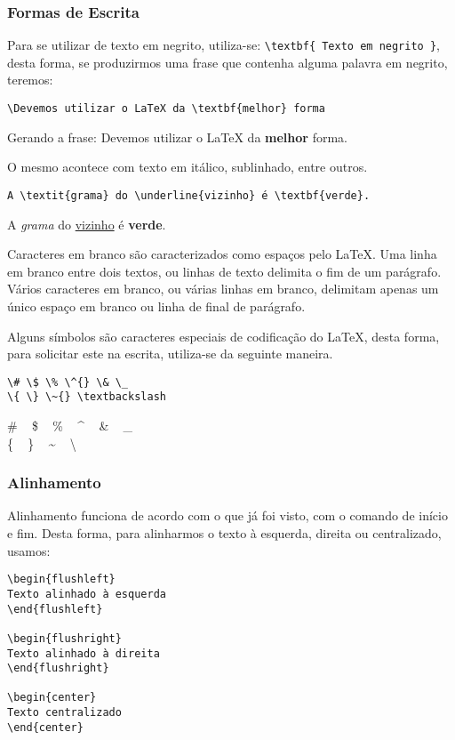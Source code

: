 \subsubsection{Formas de Escrita}
\label{formasdeescrita}
Para se utilizar de texto em negrito, utiliza-se:
\verb|\textbf{ Texto em negrito }|, desta forma, se produzirmos uma frase que contenha alguma palavra em negrito, teremos:

\begin{verbatim}
\Devemos utilizar o LaTeX da \textbf{melhor} forma
\end{verbatim}

Gerando a frase:
Devemos utilizar o LaTeX da \textbf{melhor} forma.

O mesmo acontece com texto em itálico, sublinhado, entre outros.

\begin{verbatim}
A \textit{grama} do \underline{vizinho} é \textbf{verde}.
\end{verbatim}

A \textit{grama} do \underline{vizinho} é \textbf{verde}.

Caracteres em branco são caracterizados como espaços pelo LaTeX.
Uma linha em branco entre dois textos, ou linhas de texto delimita o fim de um parágrafo.
Vários caracteres em branco, ou várias linhas em branco, delimitam apenas um único espaço em branco ou linha de final de parágrafo.

Alguns símbolos são caracteres especiais de codificação do LaTeX, desta forma, para solicitar este na escrita, utiliza-se da seguinte maneira.
\begin{multicols}{2}
\footnotesize
\begin{verbatim}
\# \$ \% \^{} \& \_ 
\{ \} \~{} \textbackslash
\end{verbatim}
\# ~ \$ ~ \% ~ \^{} ~ \& ~ \_ \\
\{ ~ \} ~ \~{} ~ \textbackslash
\end{multicols}

\subsubsection{Alinhamento}
\label{alinhamento}
Alinhamento funciona de acordo com o que já foi visto, com o comando de início e fim.
Desta forma, para alinharmos o texto à esquerda, direita ou centralizado, usamos:
\begin{verbatim}
\begin{flushleft}
Texto alinhado à esquerda
\end{flushleft}

\begin{flushright}
Texto alinhado à direita
\end{flushright}

\begin{center}
Texto centralizado
\end{center}
\end{verbatim}

